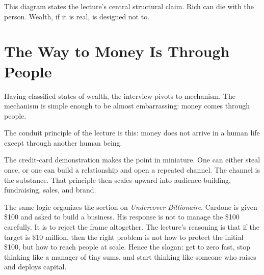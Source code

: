 This diagram states the lecture's central structural claim. Rich can die with the person. Wealth, if it is real, is designed not to.

\section{The Way to Money Is Through People}

Having classified states of wealth, the interview pivots to mechanism. The mechanism is simple enough to be almost embarrassing: money comes through people.

\begin{definition}
The conduit principle of the lecture is this: money does not arrive in a human life except through another human being.
\end{definition}

The credit-card demonstration makes the point in miniature. One can either steal once, or one can build a relationship and open a repeated channel. The channel is the substance. That principle then scales upward into audience-building, fundraising, sales, and brand.

The same logic organizes the section on \emph{Undercover Billionaire}. Cardone is given \$100 and asked to build a business. His response is not to manage the \$100 carefully. It is to reject the frame altogether. The lecture's reasoning is that if the target is \$10 million, then the right problem is not how to protect the initial \$100, but how to reach people at scale. Hence the slogan: get to zero fast, stop thinking like a manager of tiny sums, and start thinking like someone who raises and deploys capital.

\begin{figure}[h]
\centering
{}
\end{figure}

